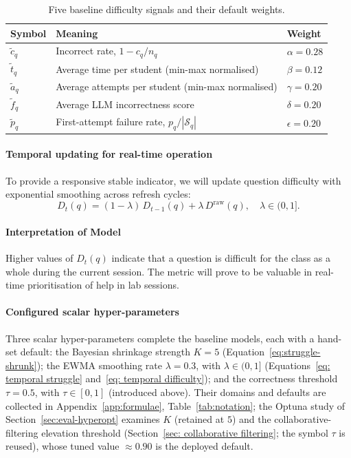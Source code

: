 \begin{table}[H]
    \centering
    \begin{tabular}{|p{}|p{}|p{}|}
    \hline
    \textbf{Symbol} & \textbf{Meaning} & \textbf{Weight} \\
    \hline
    $\tilde{c}_{q}$ & Incorrect rate, $1 - c_q/n_q$ & $\alpha = 0.28$ \\
    \hline
    $\tilde{t}_{q}$ & Average time per student (min-max normalised) & $\beta = 0.12$ \\
    \hline
    $\tilde{a}_{q}$ & Average attempts per student (min-max normalised) & $\gamma = 0.20$ \\
    \hline
    $\tilde{f}_{q}$ & Average LLM incorrectness score & $\delta = 0.20$ \\
    \hline
    $\tilde{p}_{q}$ & First-attempt failure rate, $p_q/|\mathcal{S}_q|$ & $\epsilon = 0.20$ \\
    \hline
    \end{tabular}
    \caption{Five baseline difficulty signals and their default weights.}
    \label{tab: difficulty weights}
\end{table}


\paragraph{Temporal updating for real-time operation}
To provide a responsive stable indicator, we will update question difficulty with exponential smoothing across refresh cycles:
\begin{equation}
    D_t(q) = (1-\lambda)\,D_{t-1}(q) + \lambda\,D^{\mathrm{raw}}(q), \quad \lambda \in (0,1].
    \label{eq: temporal difficulty}
\end{equation}

\paragraph{Interpretation of Model}
Higher values of $D_t(q)$ indicate that a question is difficult for the class as a whole during the current session. The metric will prove to be valuable in real-time prioritisation of help in lab sessions.

\paragraph{Configured scalar hyper-parameters}
Three scalar hyper-parameters complete the baseline models, each with a hand-set default: the Bayesian shrinkage strength $K = 5$ (Equation~\ref{eq:struggle-shrunk}); the EWMA smoothing rate $\lambda = 0.3$, with $\lambda \in (0,1]$ (Equations~\ref{eq: temporal struggle} and~\ref{eq: temporal difficulty}); and the correctness threshold $\tau = 0.5$, with $\tau \in [0,1]$ (introduced above). Their domains and defaults are collected in Appendix~\ref{app:formulae}, Table~\ref{tab:notation}; the Optuna study of Section~\ref{sec:eval-hyperopt} examines $K$ (retained at $5$) and the collaborative-filtering elevation threshold (Section~\ref{sec: collaborative filtering}; the symbol $\tau$ is reused), whose tuned value $\approx 0.90$ is the deployed default.


